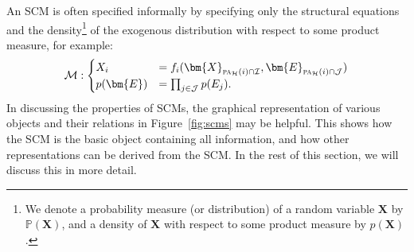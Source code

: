 \documentclass[twoside,11pt]{article}
\newcommand{\Prb}{\mathbb{P}}
\newcommand\B[1]{\bm{#1}}
\newcommand\C[1]{\mathcal{#1}}
\newcommand\mathbfsc[1]{\text{\normalfont\scshape#1}}
\newcommand\pasub[2]{\mathbfsc{pa}_{#1}(#2)}
\begin{document}
An SCM is often specified informally by specifying only the structural equations and the
density\footnote{We denote a probability measure (or distribution) of a random variable $\B{X}$ by
$\Prb(\B{X})$, and a density of $\B{X}$ with respect to some product measure by $p(\B{X})$.}  of the exogenous distribution with respect to some product measure, for example:
$$\C{M}: \begin{cases}
  X_i &= f_i(\B{X}_{\pasub{\C{H}}{i} \cap \C{I}}, \B{E}_{\pasub{\C{H}}{i} \cap \C{J}}) \\
  p(\B{E}) & = \prod_{j\in\C{J}} p(E_j).
\end{cases}$$
In discussing the properties of SCMs, the graphical representation of various objects and their relations
in Figure~\ref{fig:scms} may be helpful. This shows how the SCM is the basic object containing all information, and how other
representations can be derived from the SCM. In the rest of this section, we will discuss this in more detail.
\end{document}
